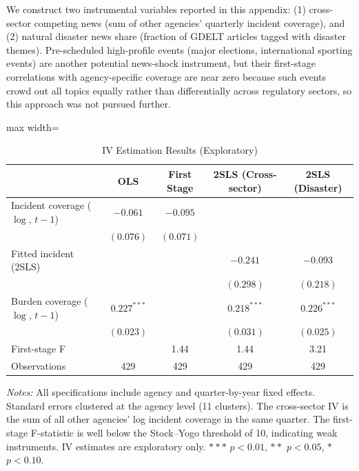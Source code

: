 \documentclass[12pt]{article}
\begin{document}
We construct two instrumental variables reported in this appendix: (1) cross-sector competing news (sum of other agencies' quarterly incident coverage), and (2) natural disaster news share (fraction of GDELT articles tagged with disaster themes). Pre-scheduled high-profile events (major elections, international sporting events) are another potential news-shock instrument, but their first-stage correlations with agency-specific coverage are near zero because such events crowd out all topics equally rather than differentially across regulatory sectors, so this approach was not pursued further.

\begin{table}[H]
\centering
\caption{IV Estimation Results (Exploratory)}
\label{tab:iv}
\begin{adjustbox}{max width=\textwidth}
\begin{threeparttable}
\begin{tabular}{lcccc}
\toprule
& OLS & First Stage & 2SLS (Cross-sector) & 2SLS (Disaster) \\
\midrule
Incident coverage ($\log$, $t-1$) & $-0.061$ & $-0.095$ & & \\
& $(0.076)$ & $(0.071)$ & & \\
Fitted incident (2SLS) & & & $-0.241$ & $-0.093$ \\
& & & $(0.298)$ & $(0.218)$ \\
Burden coverage ($\log$, $t-1$) & $0.227^{***}$ & & $0.218^{***}$ & $0.226^{***}$ \\
& $(0.023)$ & & $(0.031)$ & $(0.025)$ \\
\midrule
First-stage F & & 1.44 & 1.44 & 3.21 \\
Observations & 429 & 429 & 429 & 429 \\
\bottomrule
\end{tabular}
\begin{tablenotes}
\small
\item \textit{Notes:} All specifications include agency and quarter-by-year fixed effects. Standard errors clustered at the agency level (11 clusters). The cross-sector IV is the sum of all other agencies' log incident coverage in the same quarter. The first-stage F-statistic is well below the Stock--Yogo threshold of 10, indicating weak instruments. IV estimates are exploratory only. $***$ $p<0.01$, $**$ $p<0.05$, $*$ $p<0.10$.
\end{tablenotes}
\end{threeparttable}
\end{adjustbox}
\end{table}
\end{document}
